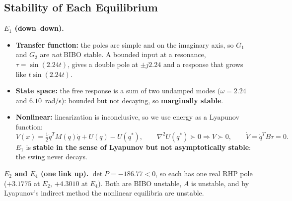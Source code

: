 \documentclass[12pt,a4paper]{article}
\begin{document}
\subsection{Stability of Each Equilibrium}
\begin{table}[H]
\centering
\caption{Stability of the four equilibria}
\label{tab:stab}
\small
{}
\end{table}

\textbf{$E_1$ (down--down).}
\begin{itemize}
\item \textbf{Transfer function:} the poles are simple and on the imaginary axis, so $G_1$ and $G_2$ are \emph{not} BIBO stable. A bounded input at a resonance, $\tau=\sin(2.24t)$, gives a double pole at $\pm j2.24$ and a response that grows like $t\sin(2.24t)$.
\item \textbf{State space:} the free response is a sum of two undamped modes ($\omega=2.24$ and $6.10$~rad/s): bounded but not decaying, so \textbf{marginally stable}.
\item \textbf{Nonlinear:} linearization is inconclusive, so we use energy as a Lyapunov function:
\begin{equation}
V(x)=\tfrac12\dot q^TM(q)\dot q+U(q)-U(q^*),\qquad \nabla^2U(q^*)\succ0\Rightarrow V\succ0,\qquad \dot V=\dot q^TB\tau=0 .
\end{equation}
$E_1$ is \textbf{stable in the sense of Lyapunov but not asymptotically stable}: the swing never decays.
\end{itemize}

\textbf{$E_2$ and $E_4$ (one link up).} $\det P=-186.77<0$, so each has one real RHP pole ($+3.1775$ at $E_2$, $+4.3010$ at $E_4$). Both are BIBO unstable, $A$ is unstable, and by Lyapunov's indirect method the nonlinear equilibria are unstable.
\end{document}
